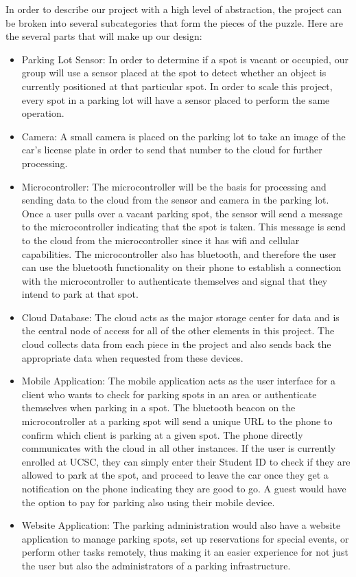 \documentclass[paper=a4, fontsize=12pt]{scrartcl}
\numberwithin{equation}{section}		%
\numberwithin{figure}{section}			%
\numberwithin{table}{section}				%
\begin{document}
In order to describe our project with a high level of abstraction, the project can be broken into several subcategories that form the pieces of the puzzle. Here are the several parts that will make up our design:

\begin{itemize}
  \item Parking Lot Sensor: In order to determine if a spot is vacant or occupied, our group will use a sensor placed at the spot to detect whether an object is currently positioned at that particular spot. In order to scale this project, every spot in a parking lot will have a sensor placed to perform the same operation. 
  \item Camera: A small camera is placed on the parking lot to take an image of the car's license plate in order to send that number to the cloud for further processing.
  \item Microcontroller: The microcontroller will be the basis for processing and sending data to the cloud from the sensor and camera in the parking lot. Once a user pulls over a vacant parking spot, the sensor will send a message to the microcontroller indicating that the spot is taken. This message is send to the cloud from the microcontroller since it has wifi and cellular capabilities. The microcontroller also has bluetooth, and therefore the user can use the bluetooth functionality on their phone to establish a connection with the microcontroller to authenticate themselves and signal that they intend to park at that spot.
  \item Cloud Database: The cloud acts as the major storage center for data and is the central node of access for all of the other elements in this project. The cloud collects data from each piece in the project and also sends back  the appropriate data when requested from these devices.
  \item Mobile Application: The mobile application acts as the user interface for a client who wants to check for parking spots in an area or authenticate themselves when parking in a spot. The bluetooth beacon on the microcontroller at a parking spot will send a unique URL to the phone to confirm which client is parking at a given spot. The phone directly communicates with the cloud in all other instances. If the user is currently enrolled at UCSC, they can simply enter their Student ID to check if they are allowed to park at the spot, and proceed to leave the car once they get a notification on the phone indicating they are good to go. A guest would have the option to pay for parking also using their mobile device.
  \item Website Application: The parking administration would also have a website application to manage parking spots, set up reservations for special events, or perform other tasks remotely, thus making it an easier experience for not just the user but also the administrators of a parking infrastructure.
\end{itemize}
\end{document}
